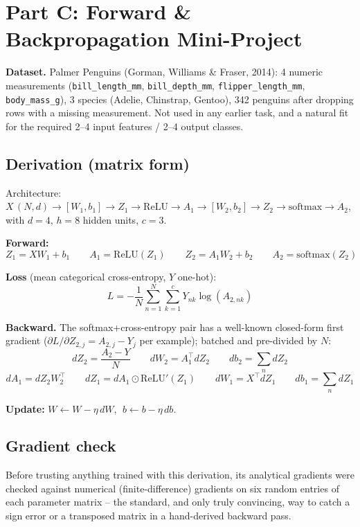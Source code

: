\documentclass[11pt,a4paper]{article}
\begin{document}
\section*{Part C: Forward \& Backpropagation Mini-Project}

\textbf{Dataset.} Palmer Penguins (Gorman, Williams \& Fraser, 2014): 4 numeric
measurements (\texttt{bill\_length\_mm}, \texttt{bill\_depth\_mm},
\texttt{flipper\_length\_mm}, \texttt{body\_mass\_g}), 3 species (Adelie, Chinstrap,
Gentoo), 342 penguins after dropping rows with a missing measurement. Not used in any
earlier task, and a natural fit for the required 2--4 input features / 2--4 output
classes.

\subsection*{Derivation (matrix form)}

Architecture: $X\,(N,d) \to [W_1,b_1] \to Z_1 \to \text{ReLU} \to A_1 \to [W_2,b_2] \to
Z_2 \to \text{softmax} \to A_2$, with $d=4$, $h=8$ hidden units, $c=3$.

\textbf{Forward:}
\[
Z_1 = XW_1 + b_1 \qquad A_1 = \text{ReLU}(Z_1) \qquad Z_2 = A_1 W_2 + b_2 \qquad A_2 = \text{softmax}(Z_2)
\]

\textbf{Loss} (mean categorical cross-entropy, $Y$ one-hot):
\[
L = -\frac{1}{N}\sum_{n=1}^{N}\sum_{k=1}^{c} Y_{nk}\log(A_{2,nk})
\]

\textbf{Backward.} The softmax+cross-entropy pair has a well-known closed-form first
gradient ($\partial L/\partial Z_{2,j} = A_{2,j} - Y_j$ per example); batched and
pre-divided by $N$:
\[
dZ_2 = \frac{A_2 - Y}{N} \qquad dW_2 = A_1^\top dZ_2 \qquad db_2 = \textstyle\sum_n dZ_2
\]
\[
dA_1 = dZ_2 W_2^\top \qquad dZ_1 = dA_1 \odot \text{ReLU}'(Z_1) \qquad dW_1 = X^\top dZ_1 \qquad db_1 = \textstyle\sum_n dZ_1
\]

\textbf{Update:} $W \leftarrow W - \eta\,dW$, $\;b \leftarrow b - \eta\,db$.

\subsection*{Gradient check}

Before trusting anything trained with this derivation, its analytical gradients were
checked against numerical (finite-difference) gradients on six random entries of each
parameter matrix -- the standard, and only truly convincing, way to catch a sign error
or a transposed matrix in a hand-derived backward pass.
\end{document}
